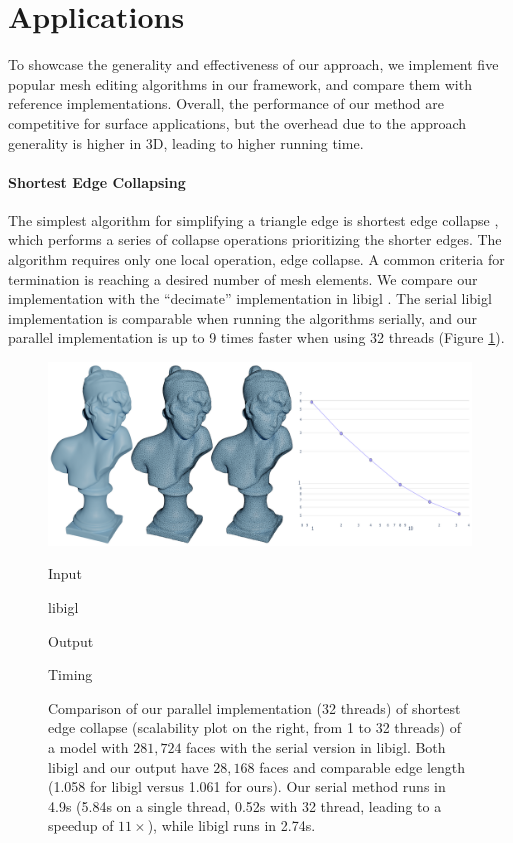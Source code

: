 \section{Applications}
\label{wmtk:sec:applications}

To showcase the generality and effectiveness of our approach, we implement five popular mesh editing algorithms in our framework, and compare them with reference implementations. Overall, the performance of our method are competitive for surface applications, but the overhead due to the approach generality is higher in 3D, leading to higher running time.

\paragraph{Shortest Edge Collapsing}

The simplest algorithm for simplifying a triangle edge is shortest edge collapse \cite{hoppe1996progressive}, which performs a series of collapse operations prioritizing the shorter edges. The algorithm requires only one local operation, edge collapse. A common criteria for termination is reaching a desired number of mesh elements. We compare our implementation with the ``decimate'' implementation in libigl \cite{jacobson2016libigl}. The serial libigl implementation is comparable when running the algorithms serially, and our parallel implementation is up to 9 times faster when using 32 threads (Figure \ref{fig:decimate}).

\begin{figure}
    \centering\footnotesize
    \includegraphics[width=\linewidth]{wmtk-tex/figs/2d-sec-statue.pdf}
    \parbox{.15\linewidth}{\centering Input}\hfill
    \parbox{.15\linewidth}{\centering libigl}
    \hfill
    \parbox{.15\linewidth}{\centering Output}\hfill
    \parbox{.3\linewidth}{\centering Timing}\par
    \caption{
    Comparison of our parallel implementation (32 threads) of shortest edge collapse (scalability plot on the right, from 1 to 32 threads) of a model with $281,724$ faces with the serial version in libigl. {Both libigl and our output have $28,168$ faces and comparable edge length (1.058 for libigl versus 1.061 for ours). Our serial method runs in 4.9s (5.84s on a single thread, 0.52s with 32 thread, leading to a speedup of $11\times$), while libigl runs in 2.74s.}}
    
    \label{fig:decimate}
\end{figure}

